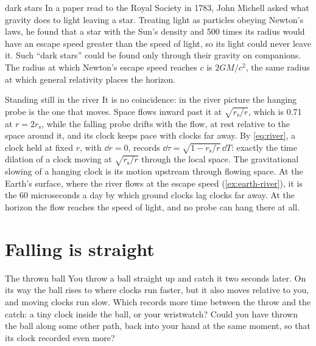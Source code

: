 \begin{history}{dark stars}
In a paper read to the Royal Society in 1783, John Michell asked what gravity
does to light leaving a star. Treating light as particles obeying Newton's
laws, he found that a star with the Sun's density and 500 times its radius
would have an escape speed greater than the speed of light, so its light
could never leave it. Such \enquote{dark stars} could be found only through
their gravity on companions. The radius at which Newton's escape speed reaches
$c$ is $2GM/c^{2}$, the same radius at which general relativity places the
horizon.
\end{history}

\begin{revisited}{Standing still in the river}
It is no coincidence: in the river picture the hanging probe is the one that
moves. Space flows inward past it at $\sqrt{r_{\mathrm{s}}/r}$, which is 0.71 at
$r = 2r_{\mathrm{s}}$, while the falling probe drifts with the flow, at rest
relative to the space around it, and its clock keeps pace with clocks far
away. By \cref{eq:river}, a clock held at fixed $r$, with $\dd r = 0$, records
$\dd\tau = \sqrt{1 - r_{\mathrm{s}}/r}\,\dd T$: exactly the time dilation of a
clock moving at $\sqrt{r_{\mathrm{s}}/r}$ through the local space. The
gravitational slowing of a hanging clock is its motion upstream through
flowing space. At the Earth's surface, where the river flows at the escape
speed (\cref{ex:earth-river}), it is the 60 microseconds a day by which
ground clocks lag clocks far away. At the horizon the flow reaches the speed
of light, and no probe can hang there at all.
\end{revisited}

\section{Falling is straight}\label{sec:geodesics}

\begin{thought}{The thrown ball}
You throw a ball straight up and catch it two seconds later. On its way the
ball rises to where clocks run faster, but it also moves relative to you, and
moving clocks run slow. Which records more time between the throw and the
catch: a tiny clock inside the ball, or your wristwatch? Could you have thrown
the ball along some other path, back into your hand at the same moment, so
that its clock recorded even more?
\end{thought}

